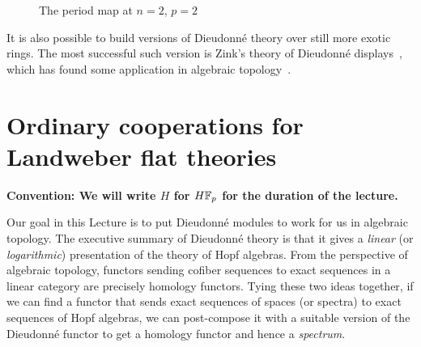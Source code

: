 \begin{figure}
\begin{center}
\end{center}
\caption{The period map at \(n = 2\), \(p = 2\)}\label{PeriodMapFigure}
\end{figure}

\begin{remark}
It is also possible to build versions of Dieudonn\'e theory over still more exotic rings.  The most successful such version is Zink's theory of Dieudonn\'e displays~\cite{ZinkDisplays}, which has found some application in algebraic topology~\cite{LawsonDisplays}.
\end{remark}









\section{Ordinary cooperations for Landweber flat theories}\label{LEFTCooperations}

\begin{center}
\textbf{Convention: We will write \(H\) for \(\HFp\) for the duration of the lecture.}
\end{center}

Our goal in this Lecture is to put Dieudonn\'e modules to work for us in algebraic topology.  The executive summary of Dieudonn\'e theory is that it gives a \emph{linear} (or \emph{logarithmic}) presentation of the theory of Hopf algebras.  From the perspective of algebraic topology, functors sending cofiber sequences to exact sequences in a linear category are precisely homology functors.  Tying these two ideas together, if we can find a functor that sends exact sequences of spaces (or spectra) to exact sequences of Hopf algebras, we can post-compose it with a suitable version of the Dieudonn\'e functor to get a homology functor and hence a \emph{spectrum}.

